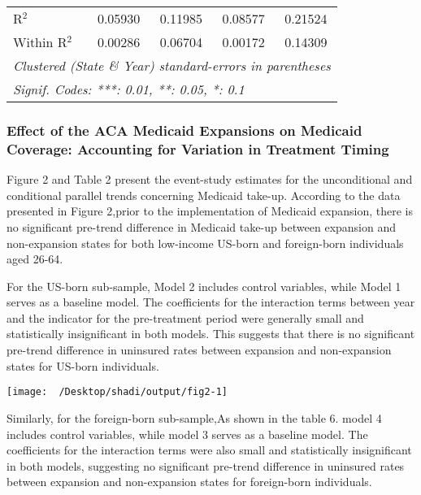 \documentclass[
]{article}
\let\origtable\table
\let\endorigtable\endtable
\renewenvironment{table}[1][ht]{
      \expandafter\origtable\expandafter[H]
    }{
      \endorigtable
    }
\begin{document}
\begin{table}[htbp]
\begin{tabular}{lcccc}
      R$^2$                 & 0.05930        & 0.11985                & 0.08577        & 0.21524\\  
      Within R$^2$          & 0.00286        & 0.06704                & 0.00172        & 0.14309\\  
      \midrule \midrule
      \multicolumn{5}{l}{\emph{Clustered (State \& Year) standard-errors in parentheses}}\\
      \multicolumn{5}{l}{\emph{Signif. Codes: ***: 0.01, **: 0.05, *: 0.1}}\\
   \end{tabular}
\end{table}

\hypertarget{effect-of-the-aca-medicaid-expansions-on-medicaid-coverage-accounting-for-variation-in-treatment-timing}{%
\subsubsection{Effect of the ACA Medicaid Expansions on Medicaid
Coverage: Accounting for Variation in Treatment
Timing}\label{effect-of-the-aca-medicaid-expansions-on-medicaid-coverage-accounting-for-variation-in-treatment-timing}}

Figure 2 and Table 2 present the event-study estimates for the
unconditional and conditional parallel trends concerning Medicaid
take-up. According to the data presented in Figure 2,prior to the
implementation of Medicaid expansion, there is no significant pre-trend
difference in Medicaid take-up between expansion and non-expansion
states for both low-income US-born and foreign-born individuals aged
26-64.

For the US-born sub-sample, Model 2 includes control variables, while
Model 1 serves as a baseline model. The coefficients for the interaction
terms between year and the indicator for the pre-treatment period were
generally small and statistically insignificant in both models. This
suggests that there is no significant pre-trend difference in uninsured
rates between expansion and non-expansion states for US-born
individuals.

\begin{center}\texttt{[image: ~/Desktop/shadi/output/fig2-1]} \end{center}

Similarly, for the foreign-born sub-sample,As shown in the table 6.
model 4 includes control variables, while model 3 serves as a baseline
model. The coefficients for the interaction terms were also small and
statistically insignificant in both models, suggesting no significant
pre-trend difference in uninsured rates between expansion and
non-expansion states for foreign-born individuals.
\end{document}
